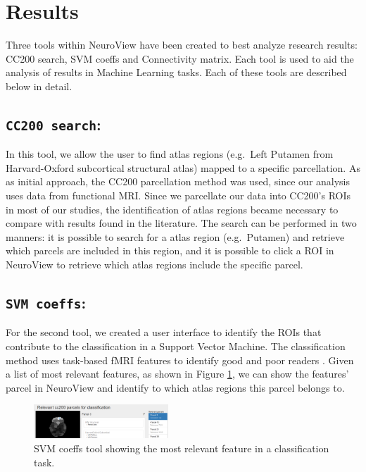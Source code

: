 \documentclass[twocolumn]{bmcart}%
\begin{document}
\section{Results}\label{results}

Three tools within NeuroView have been created to best analyze research
results: CC200 search, SVM coeffs and Connectivity matrix. Each tool is
used to aid the analysis of results in Machine Learning tasks. Each of
these tools are described below in detail.

\subsection{\texorpdfstring{\texttt{CC200 search}:}{:}}\label{section}

In this tool, we allow the user to find atlas regions (e.g.~Left Putamen
from Harvard-Oxford subcortical structural atlas) mapped to a specific
parcellation. As as initial approach, the CC200 \cite{Craddock2012}
parcellation method was used, since our analysis uses data from
functional MRI. Since we parcellate our data into CC200's ROIs in most
of our studies, the identification of atlas regions became necessary to
compare with results found in the literature. The search can be
performed in two manners: it is possible to search for a atlas region
(e.g.~Putamen) and retrieve which parcels are included in this region,
and it is possible to click a ROI in NeuroView to retrieve which atlas
regions include the specific parcel.

\subsection{\texorpdfstring{\texttt{SVM coeffs}:}{:}}\label{section-1}

For the second tool, we created a user interface to identify the ROIs
that contribute to the classification in a Support Vector Machine. The
classification method uses task-based fMRI features to identify good and
poor readers \cite{Salles2013}. Given a list of most relevant features,
as shown in Figure \ref{fig:svm_coeffs}, we can show the features'
parcel in NeuroView and identify to which atlas regions this parcel
belongs to.

\begin{figure}[ht]
\centering
\includegraphics[width=0.45\textwidth]{figs/svm_coeffs.png}
\caption{SVM coeffs tool showing the most relevant feature in a classification task.}
\label{fig:svm_coeffs}
\end{figure}
\end{document}
